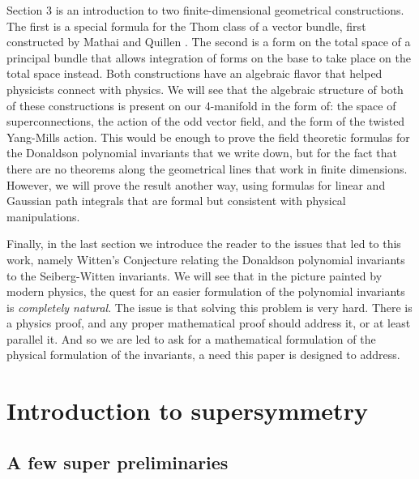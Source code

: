 \documentclass[twoside]{amsart}
\begin{document}
Section 3 is an introduction to two finite-dimensional geometrical
constructions.  The first is a special formula for the Thom class of
a vector bundle, first constructed by Mathai and Quillen \cite{mathaiquillen}.  The second
is a form on the total space of a principal bundle that allows
integration of forms on the base to take place on the total space
instead. Both constructions have an algebraic flavor that helped
physicists connect with physics.  We will see
that the algebraic structure of both of these constructions
is present on our 4-manifold in the form of: the space of
superconnections, the action of the odd vector field, and the form of
the twisted Yang-Mills action.  This would be enough to prove the
field theoretic formulas for the Donaldson polynomial invariants that
we write down, but for the fact that there are no theorems along the geometrical lines that work in finite dimensions.  However,
we will prove the result another way, using formulas for linear and
Gaussian path integrals that are formal but consistent with physical manipulations.

Finally, in the last section we introduce the reader to the issues
that led to this work, namely Witten's Conjecture relating the
Donaldson polynomial invariants to the Seiberg-Witten invariants.  We
will see that in the picture painted by modern physics, the quest for
an easier formulation of the polynomial invariants is \emph{completely
natural}.  The issue is that solving this problem is very hard.
There is a physics proof, and any proper mathematical proof should
address it, or at least parallel it.  And so we are led to ask for a
mathematical formulation of the physical formulation of the
invariants, a need this paper is designed to address.

\section{Introduction to supersymmetry}


\subsection{A few super preliminaries}
\end{document}
